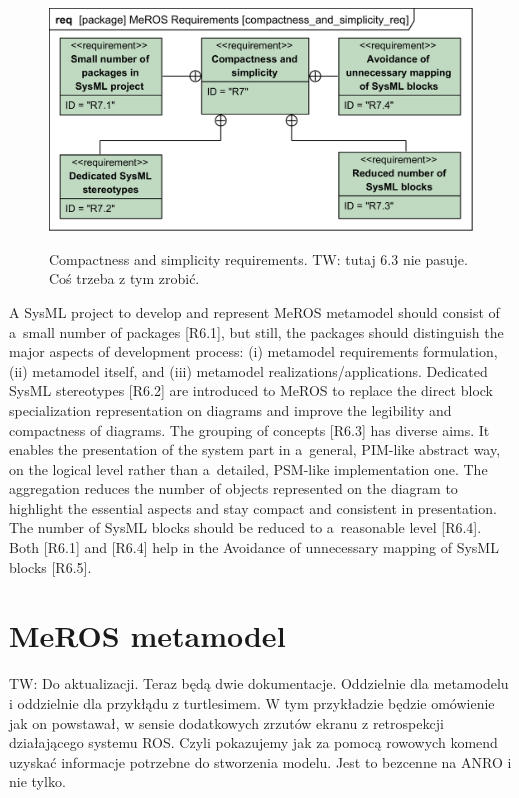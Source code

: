 \documentclass[11pt,oneside,a4paper]{report}
\newcommand{\twci}[1]{
	\textcolor{amber}{TW: #1}}
\begin{document}
	\begin{figure}[H]
		\centering
		\begin{center}
			{\includegraphics[scale=1.0]{diagrams/compactness_and_simplicity_req.png}}
		\end{center}
		\caption{Compactness and simplicity requirements.  \twci{tutaj 6.3 nie pasuje. Coś trzeba z tym zrobić.}} 
		\label{fig:compactness_and_simplicity_req}
	\end{figure}
	
	A SysML project to develop and represent MeROS metamodel should consist of a~small number of packages [R6.1], but still, the packages should distinguish the major aspects of development process: (i) metamodel requirements formulation, (ii) metamodel itself, and (iii) metamodel realizations/applications.
	Dedicated SysML stereotypes [R6.2] are introduced to MeROS to replace the direct block specialization representation on diagrams and improve the legibility and compactness of diagrams.
	The grouping of concepts [R6.3] has diverse aims. It enables the presentation of the system part in a~general, PIM-like abstract way, on the logical level rather than a~detailed, PSM-like implementation one. The aggregation reduces the number of objects represented on the diagram to highlight the essential aspects and stay compact and consistent in presentation.
	The number of SysML blocks should be reduced to a~reasonable level [R6.4]. Both [R6.1] and [R6.4] help in the Avoidance of unnecessary mapping of SysML blocks [R6.5].

	
	
\chapter{MeROS metamodel}
\label{ch:metamodel}

	\twci{Do aktualizacji. Teraz będą dwie dokumentacje. Oddzielnie dla metamodelu i oddzielnie dla przykłądu z turtlesimem. W tym przykładzie będzie omówienie jak on powstawał, w sensie dodatkowych zrzutów ekranu z retrospekcji działającego systemu ROS. Czyli pokazujemy jak za pomocą rowowych komend uzyskać informacje potrzebne do stworzenia modelu. Jest to bezcenne na ANRO i nie tylko.}
	
\end{document}
